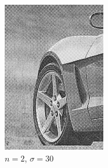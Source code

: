 \documentclass[
	12pt, %
]{style/fphw}
\begin{document}
\begin{figure}[H]
\begin{subfigure}[b]{.22\textwidth}
             \includegraphics[width=\textwidth]{plots2/Q5_3_2_30.png}
             \caption{$n=2$, $\sigma=30$}
             \label{Q5_3_2_30}
         \end{subfigure}
         \hfill
         \begin{subfigure}[b]{.22\textwidth}
             \centering

\end{subfigure}
\end{figure}
\end{document}
